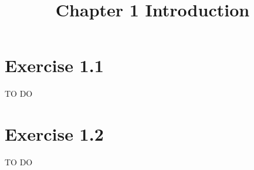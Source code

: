 \documentclass{article}
\title{Chapter 1 Introduction}
\author{}
\date{}
\begin{document}
\maketitle
\section{Exercise 1.1}
TO DO
\section{Exercise 1.2}
TO DO 
\end{document}

